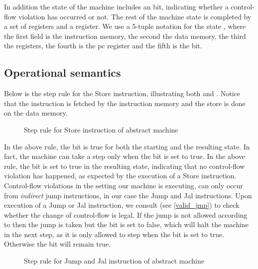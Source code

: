 In addition the state of the machine includes an \ok bit, indicating
whether a control-flow violation has occurred or not. The rest of the machine
state is completed by a set of registers and a \pc register. We use a 5-tuple
notation for the state \acfistat{\imem}{\dmem}{\reg}{\pc}{\ok}, where the first
field is the instruction memory, the second the data memory, the third the
registers, the fourth is the pc register and the fifth is the \ok bit.

\subsection{Operational semantics}\label{sec:abstract_semantics}
Below is the step rule for the Store instruction, illustrating both \NWC and
\NXD. Notice that the instruction is fetched by the instruction memory and
the store is done on the data memory.

\begin{figure}[!htb]
\caption{Step rule for Store instruction of abstract machine}
\end{figure}

In the above rule, the \ok bit is true for both the starting and the
resulting state. In fact, the machine can take a step only when the
\ok bit is set to true. In the above rule, the \ok bit is set to true
in the resulting state, indicating that no control-flow violation has
happened, as expected by the execution of a Store
instruction. Control-flow violations in the \NWC setting our machine
is executing, can only occur from \emph{indirect} jump instructions,
in our case the Jump and Jal instructions. Upon execution of a Jump or
Jal instruction, we consult \J (see \cref{valid_jmp}) to check
whether the change of control-flow is legal. If the jump is not
allowed according to \J then the jump is taken but the \ok bit is set
to false, which will halt the machine in the next step, as it is only
allowed to step when the \ok bit is set to true. Otherwise the \ok bit
will remain true.

\begin{figure}[!htpb]
\bigskip

\caption{Step rule for Jump and Jal instruction of abstract machine}
\end{figure}

